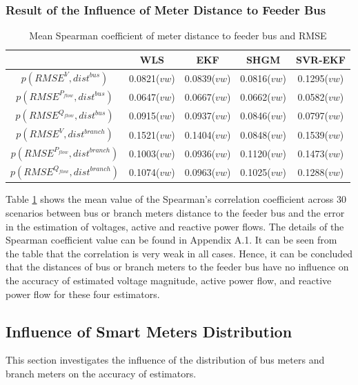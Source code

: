 \subsubsection{Result of the Influence of Meter Distance to Feeder Bus}
    \begin{table}[!h]
        \centering
        \begin{tabular}{c|c|c|c|c}
             & WLS & EKF & SHGM & SVR-EKF\\ \hline
            $p(RMSE^V,dist^{bus})$ & 0.0821($vw$) & 0.0839($vw$) & 0.0816($vw$) &  0.1295($vw$)\\
            $p(RMSE^{P_{flow}},dist^{bus})$ & 0.0647($vw$) & 0.0667($vw$) & 0.0662($vw$) &  0.0582($vw$)\\
            $p(RMSE^{Q_{flow}},dist^{bus})$ & 0.0915($vw$) & 0.0937($vw$) & 0.0846($vw$) &  0.0797($vw$)\\
            $p(RMSE^V,dist^{branch})$ & 0.1521($vw$) & 0.1404($vw$) & 0.0848($vw$) &  0.1539($vw$)\\
            $p(RMSE^{P_{flow}},dist^{branch})$ & 0.1003($vw$) & 0.0936($vw$) & 0.1120($vw$) &  0.1473($vw$)\\
            $p(RMSE^{Q_{flow}},dist^{branch})$ & 0.1074($vw$) & 0.0963($vw$) & 0.1025($vw$) &  0.1288($vw$)\\
        \end{tabular}
        \caption{Mean Spearman coefficient of meter distance to feeder bus and RMSE}
        \label{tab:spearman_meter_dist}
    \end{table}
\noindent    
Table \ref{tab:spearman_meter_dist} shows the mean value of the Spearman's correlation coefficient across 30 scenarios between bus or branch meters distance to the feeder bus and the error in the estimation of voltages, active and reactive power flows. The details of the Spearman coefficient value can be found in Appendix A.1. It can be seen from the table that the correlation is very weak in all cases. Hence, it can be concluded that the distances of bus or branch meters to the feeder bus have no influence on the accuracy of estimated voltage magnitude, active power flow, and reactive power flow for these four estimators.

\subsection{Influence of Smart Meters Distribution}
This section investigates the influence of the distribution of bus meters and branch meters on the accuracy of estimators. 
